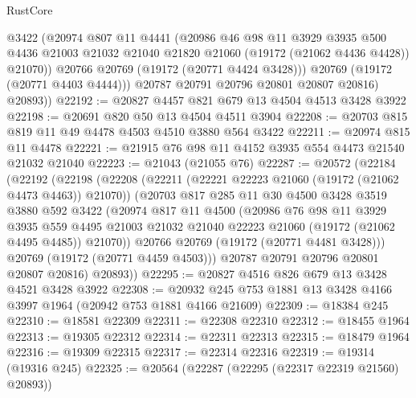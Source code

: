 \begin{lexlean}{RustCore}
\begin{coremodule}
              @3422
              (@20974
                @807
                @11
                @4441
                (@20986
                  @46
                  @98
                  @11
                  @3929
                  @3935
                  @500
                  @4436
                  @21003
                  @21032
                  @21040
                  @21820
                  @21060
                  (@19172 (@21062 @4436 @4428))
                  @21070))
              @20766
              @20769
              (@19172 (@20771 @4424 @3428)))
            @20769
            (@19172 (@20771 @4403 @4444)))
          @20787
          @20791
          @20796
          @20801
          @20807
          @20816)
        @20893))
@22192 := @20827 @4457 @821 @679 @13 @4504 @4513 @3428 @3922
@22198 := @20691 @820 @50 @13 @4504 @4511 @3904
@22208 := @20703 @815 @819 @11 @49 @4478 @4503 @4510 @3880 @564 @3422
@22211 := @20974 @815 @11 @4478
@22221 := @21915 @76 @98 @11 @4152 @3935 @554 @4473 @21540 @21032 @21040
@22223 := @21043 (@21055 @76)
@22287 := @20572
    (@22184
      (@22192
        (@22198
          (@22208
            (@22211 (@22221 @22223 @21060 (@19172 (@21062 @4473 @4463)) @21070))
            (@20703
              @817
              @285
              @11
              @30
              @4500
              @3428
              @3519
              @3880
              @592
              @3422
              (@20974
                @817
                @11
                @4500
                (@20986
                  @76
                  @98
                  @11
                  @3929
                  @3935
                  @559
                  @4495
                  @21003
                  @21032
                  @21040
                  @22223
                  @21060
                  (@19172 (@21062 @4495 @4485))
                  @21070))
              @20766
              @20769
              (@19172 (@20771 @4481 @3428)))
            @20769
            (@19172 (@20771 @4459 @4503)))
          @20787
          @20791
          @20796
          @20801
          @20807
          @20816)
        @20893))
@22295 := @20827 @4516 @826 @679 @13 @3428 @4521 @3428 @3922
@22308 := @20932 @245 @753 @1881 @13 @3428 @4166 @3997 @1964 (@20942 @753 @1881 @4166 @21609)
@22309 := @18384 @245
@22310 := @18581 @22309
@22311 := @22308 @22310
@22312 := @18455 @1964
@22313 := @19305 @22312
@22314 := @22311 @22313
@22315 := @18479 @1964
@22316 := @19309 @22315
@22317 := @22314 @22316
@22319 := @19314 (@19316 @245)
@22325 := @20564 (@22287 (@22295 (@22317 @22319 @21560) @20893))

\end{coremodule}
\end{lexlean}

